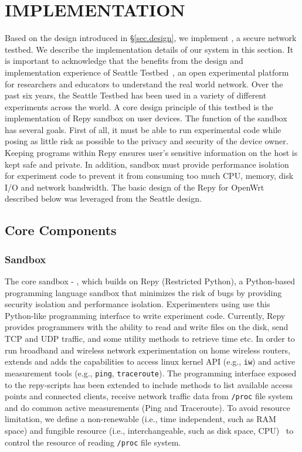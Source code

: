 \chapter{IMPLEMENTATION} 
\label{sec.implementation}
Based on the design introduced in \S{\ref{sec.design}}, we implement \sysname, a secure network testbed. We describe the implementation details of our system 
in this section. It is important to acknowledge that the \sysname benefits from the design and implementation experience of Seattle Testbed~\cite{cappos2009seattle}, an open experimental platform for researchers and educators to understand the real world network. Over the past six years, the Seattle Testbed has been used in a variety of different experiments across the world. A core design principle of this testbed is the implementation of Repy sandbox on user devices. The function of the sandbox has several goals. First of all, it must be able to run experimental code while posing as little risk as possible to the privacy and security of the device owner. Keeping programs within Repy ensures user's sensitive information on the host is kept safe and private. In addition, sandbox must provide performance isolation for experiment code to prevent it from consuming too much CPU, memory, disk I/O and network bandwidth. The basic design of the Repy for OpenWrt described below was leveraged from the Seattle design.

\section{Core Components}
\subsection{Sandbox}
\label{sec.sandbox}
The core sandbox - \sandboxname, which builds on Repy (Restricted Python), a Python-based programming language sandbox that minimizes the risk of bugs by providing security isolation and performance isolation. Experimenters using \sysname use this Python-like programming interface to write experiment code. Currently, Repy provides programmers with the ability to read and write files on the disk, send TCP and UDP traffic, and some utility methods to retrieve time etc. In order to run broadband and wireless network experimentation on home wireless routers, \sysname extends and adds the capabilities to access linux kernel API (e.g., \texttt{iw}) and active measurement tools (e.g., \texttt{ping}, \texttt{traceroute}). The programming interface exposed to the repy-scripts has been extended to include methods to list available access points and connected clients, receive network traffic data from \texttt{/proc} file system and do common active measurements (Ping and Traceroute). To avoid resource limitation, we define a non-renewable (i.e., time independent, such as RAM space) and fungible resource (i.e., interchangeable, such as disk space, CPU)~\cite{li2015fence} to control the resource of reading \texttt{/proc} file system. 

